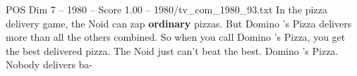 \begin{textsample}{POS Dim 7 – 1980 – Score 1.00 – 1980/tv\_com\_1980\_93.txt}  \label{ex:f7_pos_049}
In the pizza delivery game, the Noid can zap \textbf{ordinary} pizzas.
But Domino 's Pizza delivers more than all the others combined.
So when you call Domino 's Pizza, you get the best delivered pizza.
The Noid just can't beat the best.
Domino 's Pizza.
Nobody delivers ba-

\end{textsample}

